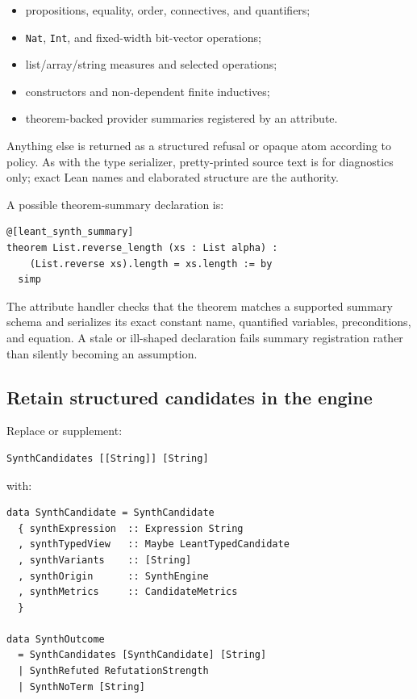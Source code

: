 \documentclass[11pt,oneside]{article}
\newcommand{\code}[1]{\texttt{#1}}
\begin{document}
\begin{itemize}
  \item propositions, equality, order, connectives, and quantifiers;
  \item \code{Nat}, \code{Int}, and fixed-width bit-vector operations;
  \item list/array/string measures and selected operations;
  \item constructors and non-dependent finite inductives;
  \item theorem-backed provider summaries registered by an attribute.
\end{itemize}

Anything else is returned as a structured refusal or opaque atom according to policy.
As with the type serializer, pretty-printed source text is for diagnostics only; exact
Lean names and elaborated structure are the authority.

A possible theorem-summary declaration is:

\begin{lstlisting}[language=Lean]
@[leant_synth_summary]
theorem List.reverse_length (xs : List alpha) :
    (List.reverse xs).length = xs.length := by
  simp
\end{lstlisting}

The attribute handler checks that the theorem matches a supported summary schema and
serializes its exact constant name, quantified variables, preconditions, and equation.
A stale or ill-shaped declaration fails summary registration rather than silently
becoming an assumption.

\subsection{Retain structured candidates in the engine}

Replace or supplement:

\begin{lstlisting}[language=HaskellExt]
SynthCandidates [[String]] [String]
\end{lstlisting}

with:

\begin{lstlisting}[language=HaskellExt]
data SynthCandidate = SynthCandidate
  { synthExpression  :: Expression String
  , synthTypedView   :: Maybe LeantTypedCandidate
  , synthVariants    :: [String]
  , synthOrigin      :: SynthEngine
  , synthMetrics     :: CandidateMetrics
  }

data SynthOutcome
  = SynthCandidates [SynthCandidate] [String]
  | SynthRefuted RefutationStrength
  | SynthNoTerm [String]
\end{lstlisting}
\end{document}
